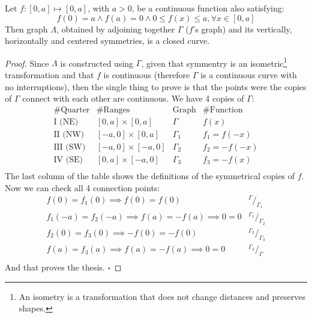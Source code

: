 \begin{proposition}
\label{lem:lclosed}
Let $f:[0,a] \mapsto [0,a]$, with $a > 0$, be a continuous function also satisfying:
\begin{equation}
\label{eq:fconds}
f(0)=a \wedge f(a)=0 \wedge 0 \leq f(x) \leq a, \forall x \in [0,a]
\end{equation}
Then graph $\Lambda$, obtained by adjoining together $\Gamma$ ($f$'s graph) and
its vertically, horizontally and centered symmetries, is a closed curve.
\begin{proof}
Since $\Lambda$ is constructed using $\Gamma$, given that symmentry is an 
isometric\footnote{An isometry is a transformation that does not change distances and
preserves shapes.} 
transformation and that $f$ is continuous (therefore $\Gamma$ is a continuous curve
with no interruptions), then the single thing to prove is that the points were
the copies of $\Gamma$ connect with each other are continuous. We have 4
copies of $\Gamma$:
\begin{equation*}
\begin{array}{c|c|c|c}
\text{\# Quarter} & \text{\# Ranges} & \text{Graph} & \text{\# Function} \\
\hline
\text{I (NE)} & [0,a] \times [0,a] & \Gamma & f(x) \\
\text{II (NW)} & [-a,0] \times [0,a] & \Gamma_1 & f_1 = f(-x) \\
\text{III (SW)} & [-a,0] \times [-a,0] & \Gamma_2 & f_2 = -f(-x) \\
\text{IV (SE)} & [0,a] \times [-a,0] & \Gamma_3 & f_3 = -f(x) \\
\end{array}
\end{equation*}
The last column of the table shows the definitions of the symmetrical copies of $f$.
Now we can check all 4 connection points:
\begin{equation}\label{eq:symms}
\begin{array}{l|c}
f(0) = f_1(0) \implies f(0) = f(0) & ^{\Gamma}/_{\Gamma_1} \\
f_1(-a) = f_2(-a) \implies f(a) = -f(a) \implies 0 = 0 & ^{\Gamma_1}/_{\Gamma_2} \\
f_2(0) = f_3(0) \implies -f(0) = -f(0) & ^{\Gamma_2}/_{\Gamma_3} \\
f(a) = f_3(a) \implies f(a) = -f(a) \implies 0 = 0 & ^{\Gamma_3}/_{\Gamma} \\
\end{array}
\end{equation}
And that proves the thesis.
$\square$
\end{proof}
\end{proposition}

